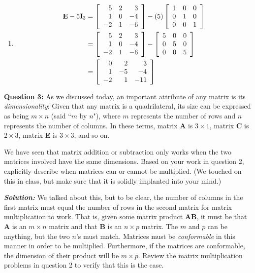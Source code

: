 \documentclass[12pt]{article}
\begin{document}
\begin{enumerate}
\item \begin{align*}
\textrm{\textbf{E}} - 5\textrm{\textbf{I}}_3 &= \left[\begin{array}{rrr}
5 & 2 & 3\\ 1 & 0 & -4 \\ -2 & 1 & -6\end{array}\right] - (5)\left[\begin{array}{rrr}
1 & 0 & 0\\
0 & 1 & 0\\
0 & 0 & 1\end{array}\right]\\
&= \left[\begin{array}{rrr}
5 & 2 & 3\\ 1 & 0 & -4 \\ -2 & 1 & -6\end{array}\right] - \left[\begin{array}{rrr}
5 & 0 & 0\\
0 & 5 & 0\\
0 & 0 & 5\end{array}\right]\\
&= \left[\begin{array}{rrr}
0 & 2 & 3\\
1 & -5 & -4\\
-2 & 1 & -11\end{array}\right]
\end{align*}

\end{enumerate}


\medskip 
\textbf{Question 3:} As we discussed today, an important attribute of any matrix is its {\it dimensionality}: Given that any matrix is a quadrilateral, its size can be expressed as being $m \times n$ (said ``$m$ by $n$"), where $m$ represents the number of rows and $n$ represents the number of columns. In these terms, matrix \textbf{A} is $3 \times 1$, matrix \textbf{C} is $2 \times 3$, matrix \textbf{E} is $3 \times 3$, and so on. 

We have seen that matrix addition or subtraction only works when the two matrices involved have the same dimensions. Based on your work in question 2, explicitly describe when matrices can or cannot be multiplied. (We touched on this in class, but make sure that it is solidly implanted into your mind.)

\medskip

\textit{\textbf{Solution:}} We talked about this, but to be clear, the number of columns in the first matrix must equal the number of rows in the second matrix for matrix multiplication to work. That is, given some matrix product \textbf{AB}, it must be that \textbf{A} is an $m \times n$ matrix and that \textbf{B} is an $n \times p$ matrix. The $m$ and $p$ can be anything, but the two $n$'s must match. Matrices must be \textit{conformable} in this manner in order to be multiplied. Furthermore, if the matrices are conformable, the dimension of their product will be $m \times p$. Review the matrix multiplication problems in question 2 to verify that this is the case.
\end{document}
